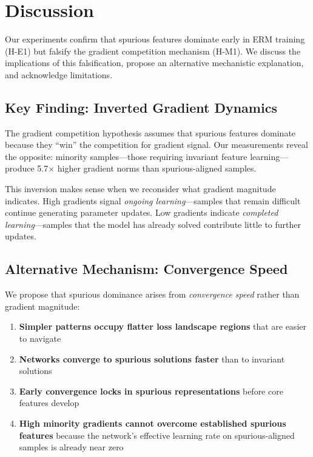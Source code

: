 \section{Discussion}

Our experiments confirm that spurious features dominate early in ERM training (H-E1) but falsify the gradient competition mechanism (H-M1). We discuss the implications of this falsification, propose an alternative mechanistic explanation, and acknowledge limitations.

\subsection{Key Finding: Inverted Gradient Dynamics}

The gradient competition hypothesis assumes that spurious features dominate because they ``win'' the competition for gradient signal. Our measurements reveal the opposite: minority samples---those requiring invariant feature learning---produce 5.7$\times$ higher gradient norms than spurious-aligned samples.

This inversion makes sense when we reconsider what gradient magnitude indicates. High gradients signal \emph{ongoing learning}---samples that remain difficult continue generating parameter updates. Low gradients indicate \emph{completed learning}---samples that the model has already solved contribute little to further updates.

\subsection{Alternative Mechanism: Convergence Speed}

We propose that spurious dominance arises from \emph{convergence speed} rather than gradient magnitude:

\begin{enumerate}
    \item \textbf{Simpler patterns occupy flatter loss landscape regions} that are easier to navigate
    \item \textbf{Networks converge to spurious solutions faster} than to invariant solutions
    \item \textbf{Early convergence locks in spurious representations} before core features develop
    \item \textbf{High minority gradients cannot overcome established spurious features} because the network's effective learning rate on spurious-aligned samples is already near zero
\end{enumerate}

